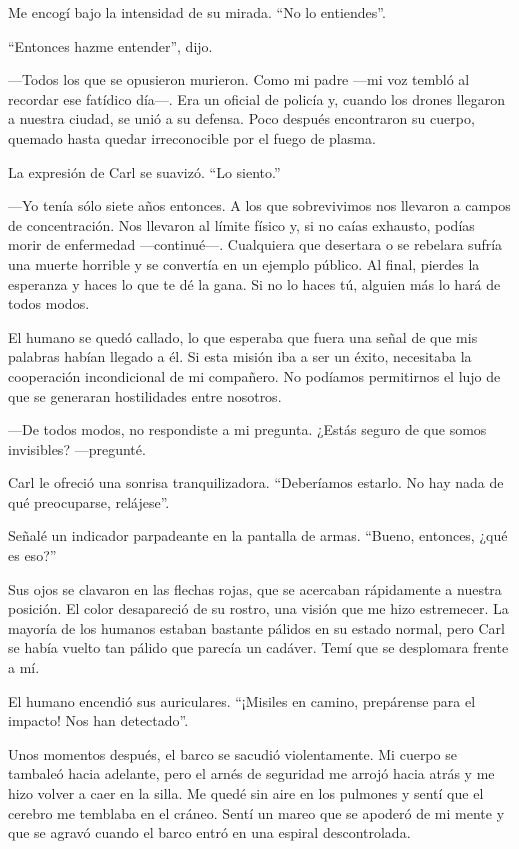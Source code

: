 Me encogí bajo la intensidad de su mirada. “No lo entiendes”.

“Entonces hazme entender”, dijo.

—Todos los que se opusieron murieron. Como mi padre —mi voz tembló al recordar ese fatídico día—. Era un oficial de policía y, cuando los drones llegaron a nuestra ciudad, se unió a su defensa. Poco después encontraron su cuerpo, quemado hasta quedar irreconocible por el fuego de plasma.

La expresión de Carl se suavizó. “Lo siento.”

—Yo tenía sólo siete años entonces. A los que sobrevivimos nos llevaron a campos de concentración. Nos llevaron al límite físico y, si no caías exhausto, podías morir de enfermedad —continué—. Cualquiera que desertara o se rebelara sufría una muerte horrible y se convertía en un ejemplo público. Al final, pierdes la esperanza y haces lo que te dé la gana. Si no lo haces tú, alguien más lo hará de todos modos.

El humano se quedó callado, lo que esperaba que fuera una señal de que mis palabras habían llegado a él. Si esta misión iba a ser un éxito, necesitaba la cooperación incondicional de mi compañero. No podíamos permitirnos el lujo de que se generaran hostilidades entre nosotros.

—De todos modos, no respondiste a mi pregunta. ¿Estás seguro de que somos invisibles? —pregunté.

Carl le ofreció una sonrisa tranquilizadora. “Deberíamos estarlo. No hay nada de qué preocuparse, relájese”.

Señalé un indicador parpadeante en la pantalla de armas. “Bueno, entonces, ¿qué es eso?”

Sus ojos se clavaron en las flechas rojas, que se acercaban rápidamente a nuestra posición. El color desapareció de su rostro, una visión que me hizo estremecer. La mayoría de los humanos estaban bastante pálidos en su estado normal, pero Carl se había vuelto tan pálido que parecía un cadáver. Temí que se desplomara frente a mí.

El humano encendió sus auriculares. “¡Misiles en camino, prepárense para el impacto! Nos han detectado”.

Unos momentos después, el barco se sacudió violentamente. Mi cuerpo se tambaleó hacia adelante, pero el arnés de seguridad me arrojó hacia atrás y me hizo volver a caer en la silla. Me quedé sin aire en los pulmones y sentí que el cerebro me temblaba en el cráneo. Sentí un mareo que se apoderó de mi mente y que se agravó cuando el barco entró en una espiral descontrolada.

